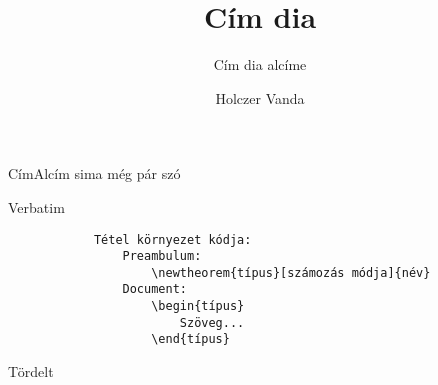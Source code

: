 \documentclass[aspectratio=169, bigger, xcolor=table]{beamer}
\begin{document}
    \begin{frame}
        \author{Holczer Vanda}
        \title{Cím dia}
        \subtitle{Cím dia alcíme}
        
        \maketitle
    \end{frame}

    \begin{frame}{Cím}{Alcím}
        sima
        \newline
        még pár szó
    \end{frame}
    
    \begin{frame}[fragile]{Verbatim}
        \begin{verbatim}
            Tétel környezet kódja:
                Preambulum:
                    \newtheorem{típus}[számozás módja]{név}
                Document:
                    \begin{típus}
                        Szöveg...
                    \end{típus}
        \end{verbatim}
    \end{frame}
    
    \begin{frame}[allowframebreaks]{Tördelt}
        \lipsum[2-5]
    \end{frame}
    
\end{document}
